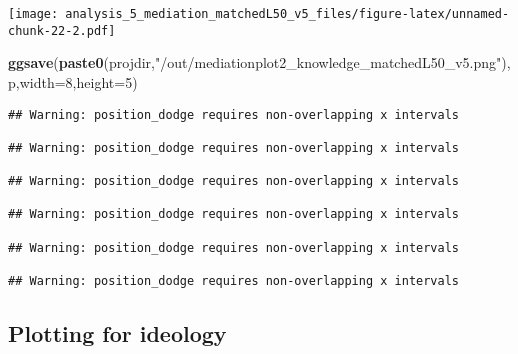 \documentclass[
]{article}
\newenvironment{Shaded}{\begin{snugshade}}{\end{snugshade}}
\newcommand{\DataTypeTok}[1]{\textcolor[rgb]{0.13,0.29,0.53}{#1}}
\newcommand{\DecValTok}[1]{\textcolor[rgb]{0.00,0.00,0.81}{#1}}
\newcommand{\KeywordTok}[1]{\textcolor[rgb]{0.13,0.29,0.53}{\textbf{#1}}}
\newcommand{\NormalTok}[1]{#1}
\newcommand{\StringTok}[1]{\textcolor[rgb]{0.31,0.60,0.02}{#1}}
\begin{document}
\texttt{[image: analysis\_5\_mediation\_matchedL50\_v5\_files/figure-latex/unnamed-chunk-22-2.pdf]}

\begin{Shaded}
\begin{Highlighting}[]
\KeywordTok{ggsave}\NormalTok{(}\KeywordTok{paste0}\NormalTok{(projdir,}\StringTok{"/out/mediationplot2_knowledge_matchedL50_v5.png"}\NormalTok{),p,}\DataTypeTok{width=}\DecValTok{8}\NormalTok{,}\DataTypeTok{height=}\DecValTok{5}\NormalTok{)}
\end{Highlighting}
\end{Shaded}

\begin{verbatim}
## Warning: position_dodge requires non-overlapping x intervals

## Warning: position_dodge requires non-overlapping x intervals

## Warning: position_dodge requires non-overlapping x intervals

## Warning: position_dodge requires non-overlapping x intervals

## Warning: position_dodge requires non-overlapping x intervals

## Warning: position_dodge requires non-overlapping x intervals
\end{verbatim}

\hypertarget{plotting-for-ideology}{%
\subsection{Plotting for ideology}\label{plotting-for-ideology}}
\end{document}
